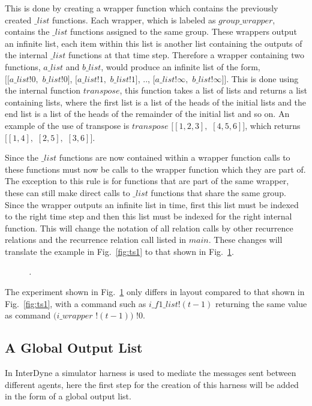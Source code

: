 \documentclass{article}
\begin{document}
This is done by creating a wrapper function which contains the previously created $\_list$ functions. Each wrapper, which is labeled as $group\_wrapper$, contains the $\_list$ functions assigned to the same group. These wrappers output an infinite list, each item within this list is another list containing the outputs of the internal $\_list$ functions at that time step. Therefore a wrapper containing two functions, $a\_list$ and $b\_list$, would produce an infinite list of the form,\\
$[[a\_list!0,$ $b\_list!0]$, $[a\_list!1,$ $b\_list!1]$, .., $[a\_list!\infty,$ $b\_list!\infty]]$. This is done using the internal function $transpose$, this function takes a list of lists and returns a list containing lists, where the first list is a list of the heads of the initial lists and the end list is a list of the heads of the remainder of the initial list and so on. An example of the use of transpose is $transpose$ $[[1,2,3],$ $[4,5,6]]$, which returns $[[1,4],$ $[2,5],$ $[3,6]]$.

Since the $\_list$ functions are now contained within a wrapper function calls to these functions must now be calls to the wrapper function which they are part of. The exception to this rule is for functions that are part of the same wrapper, these can still make direct calls to $\_list$ functions that share the same group. Since the wrapper outputs an infinite list in time, first this list must be indexed to the right time step and then this list must be indexed for the right internal function. This will change the notation of all relation calls by other recurrence relations and the recurrence relation call listed in $main$. These changes will translate the example in Fig.~\ref{fig:ts1} to that shown in Fig.~\ref{fig:ts2}.
\begin{figure}[H]
	\centering
	
	\caption{\it .}
	\label{fig:ts2}
\end{figure} 

The experiment shown in Fig.~\ref{fig:ts2} only differs in layout compared to that shown in Fig.~\ref{fig:ts1}, with a command such as $i\_f1\_list ! (t-1)$ returning the same value as command $(i\_wrapper$ $! (t-1))$ $!0$.



\subsection{A Global Output List}
In InterDyne a simulator harness is used to mediate the messages sent between different agents, here the first step for the creation of this harness will be added in the form of a global output list. 
\end{document}
